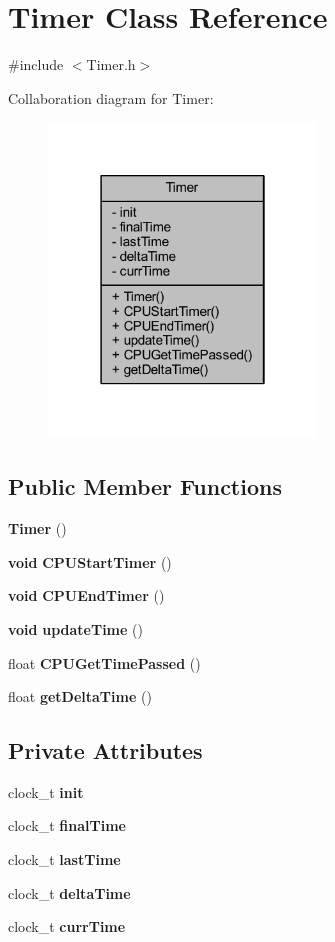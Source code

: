 \section{Timer Class Reference}
\label{class_timer}


{\ttfamily \#include $<$Timer.\+h$>$}



Collaboration diagram for Timer\+:\nopagebreak
\begin{figure}[H]
\begin{center}
\leavevmode
\includegraphics[width=202pt]{d9/d26/class_timer__coll__graph}
\end{center}
\end{figure}
\subsection*{Public Member Functions}
\begin{DoxyCompactItemize}
\item 
{\bf Timer} ()
\item 
{\bf void} {\bf C\+P\+U\+Start\+Timer} ()
\item 
{\bf void} {\bf C\+P\+U\+End\+Timer} ()
\item 
{\bf void} {\bf update\+Time} ()
\item 
float {\bf C\+P\+U\+Get\+Time\+Passed} ()
\item 
float {\bf get\+Delta\+Time} ()
\end{DoxyCompactItemize}
\subsection*{Private Attributes}
\begin{DoxyCompactItemize}
\item 
clock\+\_\+t {\bf init}
\item 
clock\+\_\+t {\bf final\+Time}
\item 
clock\+\_\+t {\bf last\+Time}
\item 
clock\+\_\+t {\bf delta\+Time}
\item 
clock\+\_\+t {\bf curr\+Time}
\end{DoxyCompactItemize}


